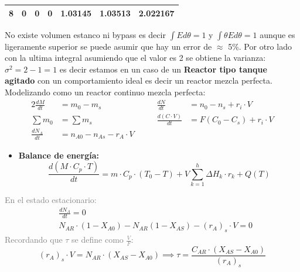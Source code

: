 \begin{enumerate}[label={\alph*)}]
\begin{center}
\begin{tabular}{|c|c|c|c|c|c|c|}
			      8        & 0     & 0                & 0                  & 1.03145             & 1.03513                          & 2.022167                           \\ \hline
		      \end{tabular}
	      \end{center}
	      \noindent No existe volumen estanco ni bypass es decir $\int E d\theta=1$ y $\int \theta E d\theta=1$ aunque es ligeramente superior se puede asumir que hay un error de $\approx$ 5\%.
	      Por otro lado con la ultima integral asumiendo que el valor es 2 se obtiene la varianza: $\sigma^2=2-1 = 1$ es decir estamos en un caso de un \textbf{Reactor tipo tanque agitado} con un comportamiento ideal es decir un reactor mezcla perfecta.
	      Modelizando como un reactor continuo mezcla perfecta:
	      \begin{alignat*}{2}
		      \frac{dM}{dt}   & = m_0 - m_s                     & \qquad \frac{dN}{dt}           & = n_0 - n_s + r_i \cdot V    \\[6pt]
		      \sum m_0        & = \sum m_s                      & \qquad \frac{d(C \cdot V)}{dt} & = F(C_0 - C_s) + r_i \cdot V \\[6pt]
		      \frac{dN_A}{dt} & = n_{A0} - n_{As} - r_A \cdot V &                                &
	      \end{alignat*}
	      \begin{itemize}
		      \item \textbf{Balance de energía:}
		            \begin{equation*}
			            \frac{d(M \cdot C_p \cdot T)}{dt} = m \cdot C_p \cdot (T_0 - T) + V \sum_{k=1}^{h} \Delta H_k \cdot r_k + Q(T)
		            \end{equation*}
	      \end{itemize}
	      {\small\textcolor{gray}{En el estado estacionario:}}
	      \begin{align*}
		       & \frac{dN_A}{dt} = 0                                             \\[6pt]
		       & N_{AR}\cdot (1-X_{A0}) - N_{AR}(1-X_{AS}) - (r_A)_s \cdot V = 0
	      \end{align*}
	      \vspace{1.5em}
	      {\small\textcolor{gray}{Recordando que $\tau$ se define como $\frac{V}{F}$:}}
	      \begin{equation*}
		      (r_A)_s \cdot V = N_{AR}\cdot (X_{AS}-X_{A0}) \implies \tau = \frac{C_{AR}\cdot (X_{AS}- X_{A0})}{(r_A)_s}
	      \end{equation*}

\end{enumerate}
